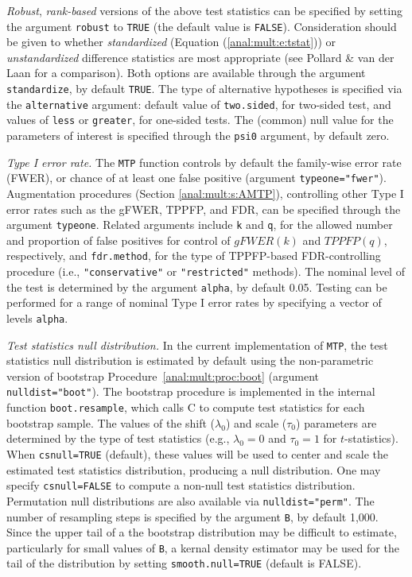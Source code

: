 \documentclass[11pt]{article}
\newcommand{\Robject}[1]{\texttt{#1}}
\begin{document}
\begin{description}
{\em Robust}, {\em rank-based} versions of the above test statistics can be specified by setting the argument \Robject{robust} to \Robject{TRUE} (the default value is \Robject{FALSE}). 
Consideration should be given to whether {\em standardized} (Equation (\ref{anal:mult:e:tstat})) or {\em unstandardized} difference statistics are most appropriate (see Pollard \& van der Laan \cite{Pollard&vdLaanJSPI04} for a comparison). Both options are available through the argument \Robject{standardize}, by default \Robject{TRUE}. 
The type of alternative hypotheses is specified via the \Robject{alternative} argument: default value of \Robject{two.sided}, for two-sided test, and values of \Robject{less} or \Robject{greater}, for one-sided tests. 
The (common) null value for the parameters of interest is specified through the \Robject{psi0} argument, by default zero.  


\item{\em Type I error rate.} 
The \Robject{MTP} function controls by default the family-wise error rate (FWER), or chance of at least one false positive (argument \Robject{typeone="fwer"}). 
Augmentation procedures (Section \ref{anal:mult:s:AMTP}), controlling other Type I error rates such as the gFWER, TPPFP, and FDR, can be specified through the argument \Robject{typeone}.
Related arguments include \Robject{k} and \Robject{q}, for the allowed number and proportion of false positives for control of $gFWER(k)$ and $TPPFP(q)$, respectively, and \Robject{fdr.method}, for the type of TPPFP-based FDR-controlling procedure (i.e., \Robject{"conservative"} or \Robject{"restricted"} methods).
The nominal level of the test is determined by the argument \Robject{alpha}, by default 0.05. 
Testing can be performed for a range of nominal Type I error rates by specifying a vector of levels \Robject{alpha}. 


\item{\em Test statistics null distribution.} 
In the current implementation of \Robject{MTP}, the test statistics null distribution is estimated by default using the non-parametric version of bootstrap Procedure~\ref{anal:mult:proc:boot} (argument \Robject{nulldist="boot"}). 
The bootstrap procedure is implemented in the internal function \Robject{boot.resample}, which calls C to compute test statistics for each bootstrap sample.
The values of the shift ($\lambda_0$) and scale ($\tau_0$) parameters are determined by the type of test statistics (e.g., $\lambda_0=0$ and $\tau_0=1$ for $t$-statistics). When \Robject{csnull=TRUE} (default), these values will be used to center and scale the estimated test statistics distribution, producing a null distribution. One may specify \Robject{csnull=FALSE} to compute a non-null test statistics distribution.
Permutation null distributions are also available via \Robject{nulldist="perm"}.
The number of resampling steps is specified by the argument \Robject{B}, by default 1,000. 
Since the upper tail of a the bootstrap distribution may be difficult to estimate, particularly for small values of \Robject{B}, a kernal density estimator may be used for the tail of the distribution by setting \Robject{smooth.null=TRUE} (default is FALSE). 


\end{description}
\end{document}
